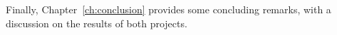 Finally, Chapter~\ref{ch:conclusion} provides some concluding remarks, with a discussion on the results of both projects.



